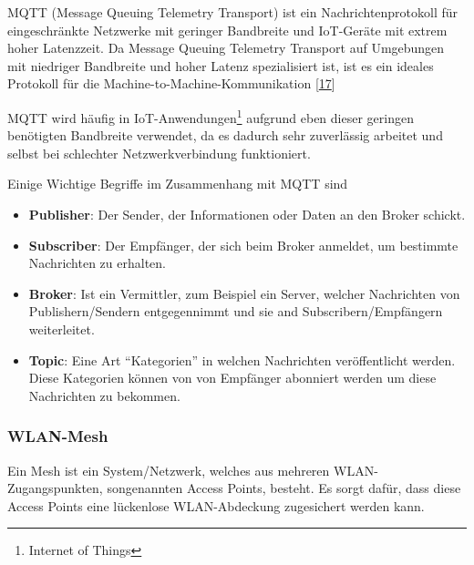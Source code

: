 \documentclass[
    headings=optiontotocandhead,%
    twoside,
    numbers=noenddot,%
    12pt, %
    titlepage, %
    parskip=full, %
    listof=leveldown, 
    numbers=noenddot, %
    a4paper,DIV=14,
    BCOR=15mm,
]{scrbook}
\renewenvironment{quote}{\begin{customblockquote}\list{}{\rightmargin=0em\leftmargin=0em}%
\item\relax\color{blockquote-text}\ignorespaces}{\unskip\unskip\endlist\end{customblockquote}}
\providecommand{\tightlist}{%
  \setlength{\itemsep}{0pt}\setlength{\parskip}{0pt}}
\begin{document}
\begin{quote}
MQTT (Message Queuing Telemetry Transport) ist ein Nachrichtenprotokoll
für eingeschränkte Netzwerke mit geringer Bandbreite und IoT-Geräte mit
extrem hoher Latenzzeit. Da Message Queuing Telemetry Transport auf
Umgebungen mit niedriger Bandbreite und hoher Latenz spezialisiert ist,
ist es ein ideales Protokoll für die Machine-to-Machine-Kommunikation
{[}\protect\hyperlink{ref-Inray-GmbH}{17}{]}
\end{quote}

MQTT wird häufig in IoT-Anwendungen\footnote{Internet of Things}
aufgrund eben dieser geringen benötigten Bandbreite verwendet, da es
dadurch sehr zuverlässig arbeitet und selbst bei schlechter
Netzwerkverbindung funktioniert.

Einige Wichtige Begriffe im Zusammenhang mit MQTT sind

\begin{itemize}
\tightlist
\item
  \textbf{Publisher}: Der Sender, der Informationen oder Daten an den
  Broker schickt.
\item
  \textbf{Subscriber}: Der Empfänger, der sich beim Broker anmeldet, um
  bestimmte Nachrichten zu erhalten.
\item
  \textbf{Broker}: Ist ein Vermittler, zum Beispiel ein Server, welcher
  Nachrichten von Publishern/Sendern entgegennimmt und sie and
  Subscribern/Empfängern weiterleitet.
\item
  \textbf{Topic}: Eine Art ``Kategorien'' in welchen Nachrichten
  veröffentlicht werden. Diese Kategorien können von von Empfänger
  abonniert werden um diese Nachrichten zu bekommen.
\end{itemize}

\hypertarget{wlan-mesh}{%
\subsubsection{WLAN-Mesh}\label{wlan-mesh}}

Ein Mesh ist ein System/Netzwerk, welches aus mehreren
WLAN-Zugangspunkten, songenannten Access Points, besteht. Es sorgt
dafür, dass diese Access Points eine lückenlose WLAN-Abdeckung
zugesichert werden kann.
\end{document}
